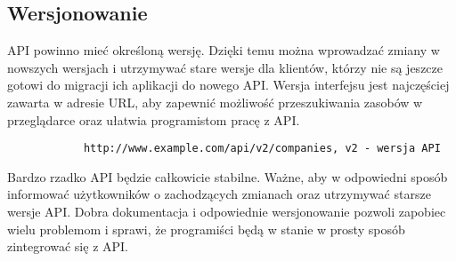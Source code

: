 	\subsection{Wersjonowanie}
		API powinno mieć określoną wersję. Dzięki temu można wprowadzać zmiany w nowszych wersjach i utrzymywać stare  wersje dla klientów, którzy nie są jeszcze gotowi do migracji ich aplikacji do nowego API. Wersja interfejsu jest najczęściej zawarta w adresie URL, aby zapewnić możliwość przeszukiwania zasobów w przeglądarce oraz ułatwia programistom pracę z API. 
		
		\begin{verbatim}
			http://www.example.com/api/v2/companies, v2 - wersja API
		\end{verbatim}
		
		Bardzo rzadko API będzie całkowicie stabilne. Ważne, aby w odpowiedni sposób informować użytkowników o zachodzących zmianach oraz utrzymywać starsze wersje API. Dobra dokumentacja i odpowiednie wersjonowanie pozwoli zapobiec wielu problemom i sprawi, że programiści będą w stanie w prosty sposób zintegrować się z API.
		
